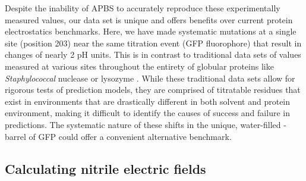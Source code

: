 Despite the inability of APBS to accurately reproduce these experimentally measured \pKa{} values, our data set is unique and offers benefits over current protein electrostatics benchmarks.
Here, we have made systematic mutations at a single site (position 203) near the same titration event (GFP fluorophore) that result in \pKa{} changes of nearly 2 pH units.
This is in contrast to traditional data sets of \pKa{} values measured at various sites throughout the entirety of globular proteins like \emph{Staphylococcal} nuclease or lysozyme \cite{Nielsen2011, Castaneda2009, Merz1991}.
While these traditional data sets allow for rigorous tests of \pKa{} prediction models, they are comprised of titratable residues that exist in environments that are drastically different in both solvent and protein environment, making it difficult to identify the causes of success and failure in \pKa{} predictions.
The systematic nature of these \pKa{} shifts in the unique, water-filled \textbeta{}-barrel of GFP could offer a convenient alternative benchmark. 

\subsection{Calculating nitrile electric fields}

